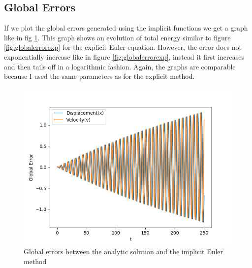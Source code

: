 \documentclass{article}
\begin{document}
\subsection{Global Errors}
If we plot the global errors generated using the implicit functions we get a graph like in fig \ref{fig:globalerrorimp}. This graph shows an evolution of total energy similar to figure \ref{fig:globalerrorexp} for the explicit Euler equation. However, the error does not exponentially increase like in figure \ref{fig:globalerrorexp}, instead it first increases and then tails off in a logarithmic fashion. Again, the graphs are comparable because I used the same parameters as for the explicit method.
\begin{figure}[h]
    \centering
    \includegraphics[width = \textwidth]{Images/globalerrorimp.png}
    \caption{Global errors between the analytic solution and the implicit Euler method}
    \label{fig:globalerrorimp}
\end{figure}
\end{document}

